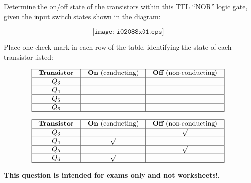 

Determine the on/off state of the transistors within this TTL ``NOR'' logic gate, given the input switch states shown in the diagram:

$$\texttt{[image: i02088x01.eps]}$$

Place one check-mark in each row of the table, identifying the state of each transistor listed:


$$\vbox{\offinterlineskip
\halign{\strut
\vrule \quad\hfil # \ \hfil & 
\vrule \quad\hfil # \ \hfil & 
\vrule \quad\hfil # \ \hfil \vrule \cr
\noalign{\hrule}
%
{\bf Transistor} & {\bf On} (conducting) & {\bf Off} (non-conducting) \cr
%
\noalign{\hrule}
%
$Q_3$ &  &  \cr
%
\noalign{\hrule}
%
$Q_4$ &  &  \cr
%
\noalign{\hrule}
%
$Q_5$ &  &  \cr
%
\noalign{\hrule}
%
$Q_6$ &  &  \cr
%
\noalign{\hrule}
} %
}$$ %








$$\vbox{\offinterlineskip
\halign{\strut
\vrule \quad\hfil # \ \hfil & 
\vrule \quad\hfil # \ \hfil & 
\vrule \quad\hfil # \ \hfil \vrule \cr
\noalign{\hrule}
%
{\bf Transistor} & {\bf On} (conducting) & {\bf Off} (non-conducting) \cr
%
\noalign{\hrule}
%
$Q_3$ &  & $\surd$ \cr
%
\noalign{\hrule}
%
$Q_4$ & $\surd$ &  \cr
%
\noalign{\hrule}
%
$Q_5$ &  & $\surd$ \cr
%
\noalign{\hrule}
%
$Q_6$ & $\surd$ &  \cr
%
\noalign{\hrule}
} %
}$$ %







{\bf This question is intended for exams only and not worksheets!}.


